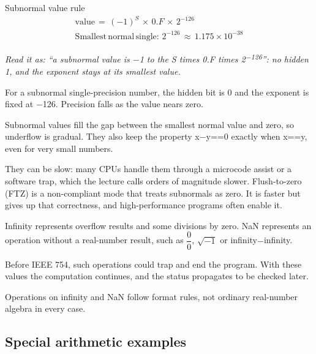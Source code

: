 \documentclass[11pt]{article}
\begin{document}
\begin{keepsection}
\begin{equationcard}{Subnormal value rule}
\[ \begin{gathered} \text{value}\, =\, (-1)^{{S}}\, \times \, 0.{F}\, \times \, 2^{-126} \\ \text{Smallest}\, \text{normal}\, \text{single}:\, 2^{-126}\, \approx \, 1.175\times 10^{-38} \end{gathered} \]
{\small \emph{Read it as: “a subnormal value is \ensuremath{-}1 to the S times 0.F times 2\textsuperscript{\ensuremath{-}126}”: no hidden 1, and the exponent stays at its smallest value.}\par For a subnormal single-precision number, the hidden bit is 0 and the exponent is fixed at \ensuremath{-}126. Precision falls as the value nears zero.}
\end{equationcard}

Subnormal values fill the gap between the smallest normal value and zero, so underflow is gradual. They also keep the property x\ensuremath{-}y==0 exactly when x==y, even for very small numbers.

They can be slow: many CPUs handle them through a microcode assist or a software trap, which the lecture calls orders of magnitude slower. Flush-to-zero (FTZ) is a non-compliant mode that treats subnormals as zero. It is faster but gives up that correctness, and high-performance programs often enable it.

Infinity represents overflow results and some divisions by zero. NaN represents an operation without a real-number result, such as {\small\ensuremath{\dfrac{0}{0}}}, \ensuremath{\sqrt{-1}} or infinity\ensuremath{-}infinity.

Before IEEE 754, such operations could trap and end the program. With these values the computation continues, and the status propagates to be checked later.

Operations on infinity and NaN follow format rules, not ordinary real-number algebra in every case.

\begin{keepsection}
\subsection{Special arithmetic examples}


\end{keepsection}
\end{keepsection}
\end{document}
